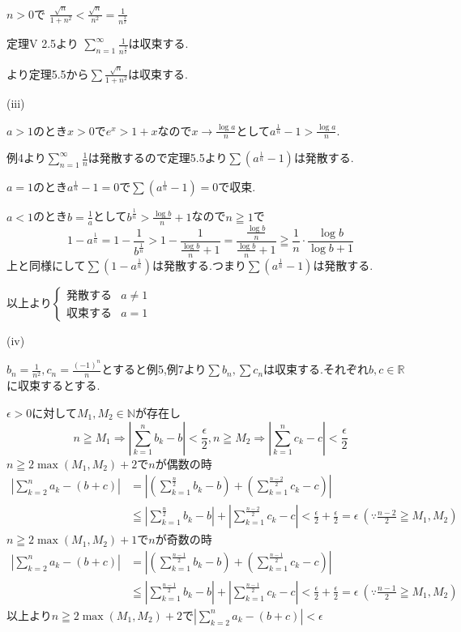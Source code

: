 \documentclass{jsarticle}
\begin{document}
$n>0$で
$\frac{\sqrt{n}}{1+n^2} < \frac{\sqrt{n}}{n^2} = \frac{1}{n^{\frac{3}{2}}}$

定理V 2.5より $\displaystyle\sum_{n=1}^{\infty} \frac{1}{n^{\frac{3}{2}}}$は収束する.

より定理5.5から$\sum \frac{\sqrt{n}}{1+n^2}$は収束する.

(iii)

$a > 1$のとき$x > 0$で$e^x > 1+x$なので$x\rightarrow \frac{\log a}{n}$として$a^{\frac{1}{n}}-1 > \frac{\log a}{n}$.

例4より$\displaystyle \sum_{n=1}^\infty \frac{1}{n}$は発散するので定理5.5より$\sum (a^{\frac{1}{n}}-1)$は発散する.

$a = 1$のとき$a^{\frac{1}{n}}-1=0$で$\sum (a^{\frac{1}{n}}-1)=0$で収束.

$a < 1$のとき$b=\frac{1}{a}$として$b^{\frac{1}{n}} > \frac{\log b}{n} + 1$なので$n\geqq 1$で
\[1-a^{\frac{1}{n}}  = 1-\frac{1}{b^{\frac{1}{n}}} > 1-\frac{1}{\frac{\log b}{n} + 1} =
\frac{\frac{\log b}{n}}{\frac{\log b}{n} + 1}
\geqq \frac{1}{n}\cdot\frac{\log b}{\log b+1}\]
上と同様にして$\sum (1- a^{\frac{1}{n}})$は発散する.つまり$\sum (a^{\frac{1}{n}}-1)$は発散する.

以上より$\begin{cases}
発散する & a\neq 1\\
収束する & a = 1
\end{cases}$

(iv)

$b_n=\frac{1}{n^2},c_n = \frac{(-1)^n}{n}$とすると例5,例7より$\sum b_n,\sum c_n$は収束する.それぞれ$b,c\in\mathbb{R}$に収束するとする.

$\epsilon > 0$に対して$M_1,M_2\in\mathbb{N}$が存在し
\[n\geqq M_1\Rightarrow |\sum_{k=1}^nb_k - b| < \frac{\epsilon}{2} , n\geqq M_2\Rightarrow |\sum_{k=1}^nc_k - c| < \frac{\epsilon}{2} \]
$n\geqq 2\max (M_1,M_2)+2$で$n$が偶数の時
\begin{align*}
|\sum_{k=2}^n a_k - (b+c)| &= |(\sum_{k=1}^{\frac{n}{2}} b_k - b)+(\sum_{k=1}^{\frac{n-2}{2}} c_k - c)|\\
&\leqq |\sum_{k=1}^{\frac{n}{2}} b_k - b|+|\sum_{k=1}^{\frac{n-2}{2}} c_k - c| < \frac{\epsilon}{2}+\frac{\epsilon}{2} = \epsilon \ (\because \frac{n-2}{2} \geqq M_1,M_2)
\end{align*}
$n\geqq 2\max (M_1,M_2)+1$で$n$が奇数の時
\begin{align*}
|\sum_{k=2}^n a_k - (b+c)| &= |(\sum_{k=1}^{\frac{n-1}{2}} b_k - b)+(\sum_{k=1}^{\frac{n-1}{2}} c_k - c)|\\
&\leqq |\sum_{k=1}^{\frac{n-1}{2}} b_k - b|+|\sum_{k=1}^{\frac{n-1}{2}} c_k - c| < \frac{\epsilon}{2}+\frac{\epsilon}{2} = \epsilon \ (\because \frac{n-1}{2} \geqq M_1,M_2)
\end{align*}
以上より$n\geqq 2\max (M_1,M_2)+2$で$\displaystyle |\sum_{k=2}^na_k - (b+c)| < \epsilon$
\end{document}
